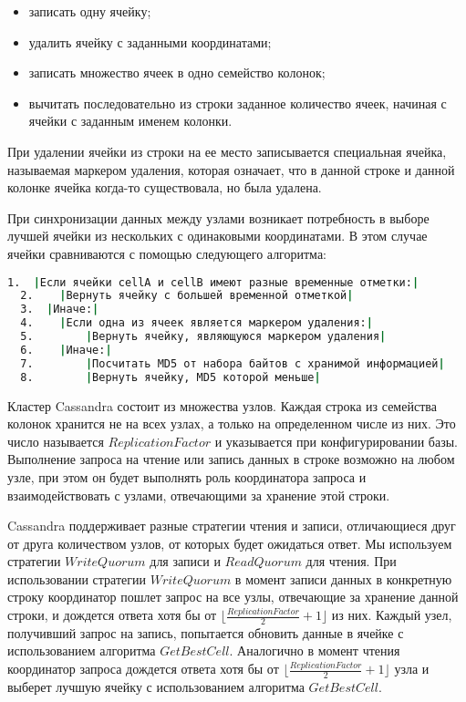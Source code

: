 \begin{itemize}
	\item записать одну ячейку;
	\item удалить ячейку с заданными координатами;
	\item записать множество ячеек в одно семейство колонок;
	\item вычитать последовательно из строки заданное количество ячеек, начиная с ячейки с заданным именем колонки.
\end{itemize}

При удалении ячейки из строки на ее место записывается специальная ячейка, называемая маркером удаления, которая означает, что в данной строке и данной колонке ячейка когда-то существовала, но была удалена.

При синхронизации данных между узлами возникает потребность в выборе лучшей ячейки из нескольких с одинаковыми координатами. В этом случае ячейки сравниваются с помощью следующего алгоритма:
\begin{lstlisting}[language=csh,caption={Алгоритм GetBestCell(cellA, cellB)}]
  1.  |Если ячейки cellA и cellB имеют разные временные отметки:|
  2.  	|Вернуть ячейку с большей временной отметкой|
  3.  |Иначе:|
  4.  	|Если одна из ячеек является маркером удаления:|
  5.  		|Вернуть ячейку, являющуюся маркером удаления|
  6.  	|Иначе:|
  7.  		|Посчитать MD5 от набора байтов с хранимой информацией|
  8.  		|Вернуть ячейку, MD5 которой меньше|
\end{lstlisting}

Кластер Cassandra состоит из множества узлов. Каждая строка из семейства колонок хранится не на всех узлах, а только на определенном числе из них. Это число называется $ReplicationFactor$ и указывается при конфигурировании базы. Выполнение запроса на чтение или запись данных в строке возможно на любом узле, при этом он будет выполнять роль координатора запроса и взаимодействовать с узлами, отвечающими за хранение этой строки.

Cassandra поддерживает разные стратегии чтения и записи, отличающиеся друг от друга количеством узлов, от которых будет ожидаться ответ. Мы используем стратегии $WriteQuorum$ для записи и $ReadQuorum$ для чтения. При использовании стратегии $WriteQuorum$ в момент записи данных в конкретную строку координатор пошлет запрос на все узлы, отвечающие за хранение данной строки, и дождется ответа хотя бы от $\lfloor \frac{ReplicationFactor}{2} + 1\rfloor$ из них. Каждый узел, получивший запрос на запись, попытается обновить данные в ячейке с использованием алгоритма $GetBestCell$.
Аналогично в момент чтения координатор запроса дождется ответа хотя бы от $\lfloor \frac{ReplicationFactor}{2} + 1\rfloor$ узла и выберет лучшую ячейку с использованием алгоритма $GetBestCell$.


